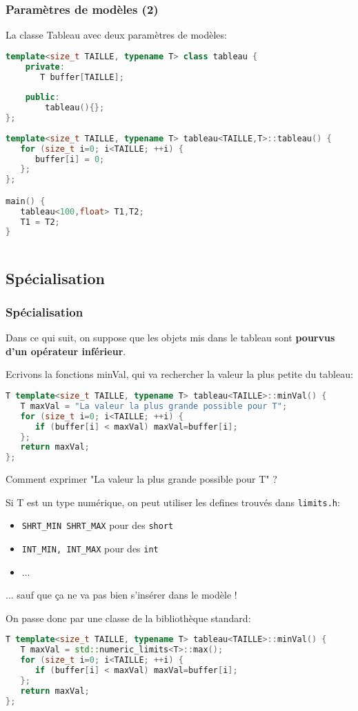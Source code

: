 \documentclass{beamer}
\begin{document}
\begin{frame}[fragile=singleslide,shrink=20]
\frametitle {Paramètres de modèles (2)}

La classe Tableau avec deux paramètres de modèles:
\begin{lstlisting}[language=c++]
template<size_t TAILLE, typename T> class tableau {
    private:
       T buffer[TAILLE];
    
    public:
        tableau(){};
};
    
template<size_t TAILLE, typename T> tableau<TAILLE,T>::tableau() {
   for (size_t i=0; i<TAILLE; ++i) { 
      buffer[i] = 0; 
   };
};

main() {
   tableau<100,float> T1,T2;
   T1 = T2;
}
   
\end{lstlisting}
\end{frame}

\subsection{Spécialisation}

\begin{frame}[fragile=singleslide,shrink=20]
\frametitle {Spécialisation}

Dans ce qui suit, on  suppose que les objets mis dans le tableau sont \textbf{pourvus d'un opérateur inférieur}.

Ecrivons la fonctions minVal, qui va rechercher la valeur la plus petite du tableau:

\begin{lstlisting}[language=c++]
T template<size_t TAILLE, typename T> tableau<TAILLE>::minVal() {
   T maxVal = "La valeur la plus grande possible pour T";
   for (size_t i=0; i<TAILLE; ++i) {
      if (buffer[i] < maxVal) maxVal=buffer[i];
   };
   return maxVal;
};
\end{lstlisting}

Comment exprimer "La valeur la plus grande possible pour T" ?

Si T est un type numérique, on peut utiliser les defines trouvés dans \texttt{limits.h}:

\begin{itemize}
\item{ \texttt{SHRT\_MIN SHRT\_MAX} pour des \texttt{short}}
\item{ \texttt{INT\_MIN, INT\_MAX} pour des \texttt{int}}
\item{...}
\end{itemize}
... sauf que ça ne va pas bien s'insérer dans le modèle !

On passe donc par une classe de la bibliothèque standard:
\begin{lstlisting}[language=c++]
T template<size_t TAILLE, typename T> tableau<TAILLE>::minVal() {
   T maxVal = std::numeric_limits<T>::max();
   for (size_t i=0; i<TAILLE; ++i) {
      if (buffer[i] < maxVal) maxVal=buffer[i];
   };
   return maxVal;
};
\end{lstlisting}
\end{frame}
\end{document}
